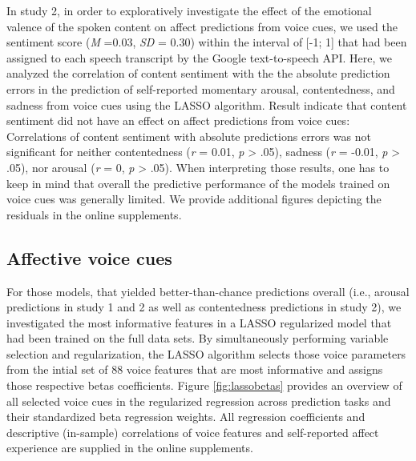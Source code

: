 \documentclass[
  english,
  man,floatsintext]{apa6}
\begin{document}
In study 2, in order to exploratively investigate the effect of the emotional valence of the spoken content on affect predictions from voice cues, we used the sentiment score (\emph{M} =0.03, \emph{SD} = 0.30) within the interval of {[}-1; 1{]} that had been assigned to each speech transcript by the Google text-to-speech API. Here, we analyzed the correlation of content sentiment with the the absolute prediction errors in the prediction of self-reported momentary arousal, contentedness, and sadness from voice cues using the LASSO algorithm. Result indicate that content sentiment did not have an effect on affect predictions from voice cues: Correlations of content sentiment with absolute predictions errors was not significant for neither contentedness (\emph{r} = 0.01, \emph{p} \textgreater{} .05), sadness (\emph{r} = -0.01, \emph{p} \textgreater{} .05), nor arousal (\emph{r} = 0, \emph{p} \textgreater{} .05). When interpreting those results, one has to keep in mind that overall the predictive performance of the models trained on voice cues was generally limited. We provide additional figures depicting the residuals in the online supplements.

\newpage

\hypertarget{affective-voice-cues}{%
\subsection{Affective voice cues}\label{affective-voice-cues}}

For those models, that yielded better-than-chance predictions overall (i.e., arousal predictions in study 1 and 2 as well as contentedness predictions in study 2), we investigated the most informative features in a LASSO regularized model that had been trained on the full data sets. By simultaneously performing variable selection and regularization, the LASSO algorithm selects those voice parameters from the intial set of 88 voice features that are most informative and assigns those respective betas coefficients. Figure \ref{fig:lassobetas} provides an overview of all selected voice cues in the regularized regression across prediction tasks and their standardized beta regression weights. All regression coefficients and descriptive (in-sample) correlations of voice features and self-reported affect experience are supplied in the online supplements.
\end{document}
